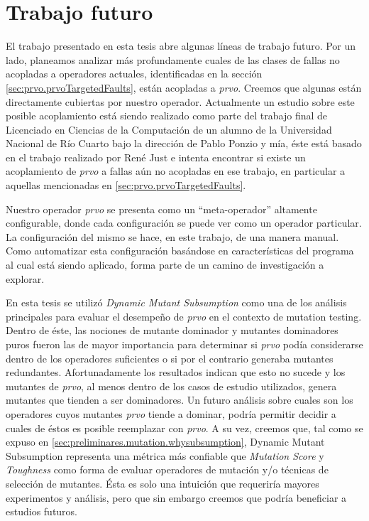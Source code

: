 \chapter[Trabajo futuro]{Trabajo futuro}
\label{cap:futurework}

El trabajo presentado en esta tesis abre algunas l\'ineas de trabajo futuro. Por un lado, planeamos analizar m\'as profundamente cuales de las clases de fallas no acopladas a operadores actuales, identificadas en la secci\'on \ref{sec:prvo.prvoTargetedFaults}, est\'an acopladas a \emph{prvo}. Creemos que algunas est\'an directamente cubiertas por nuestro operador. Actualmente un estudio sobre este posible acoplamiento est\'a siendo realizado como parte del trabajo final de Licenciado en Ciencias de la Computaci\'on de un alumno de la Universidad Nacional de R\'io Cuarto bajo la direcci\'on de Pablo Ponzio y m\'ia, \'este est\'a basado en el trabajo realizado por Ren\'e Just \cite{bibliography.mutation.evaluation.valid-substitute} e intenta encontrar si existe un acoplamiento de \emph{prvo} a fallas a\'un no acopladas en ese trabajo, en particular a aquellas mencionadas en \ref{sec:prvo.prvoTargetedFaults}.

Nuestro operador \emph{prvo} se presenta como un ``meta-operador'' altamente configurable, donde cada configuraci\'on se puede ver como un operador particular. La configuraci\'on del mismo se hace, en este trabajo, de una manera manual. Como automatizar esta configuraci\'on bas\'andose en caracter\'isticas del programa al cual est\'a siendo aplicado, forma parte de un camino de investigaci\'on a explorar.

En esta tesis se utiliz\'o \emph{Dynamic Mutant Subsumption} como una de los an\'alisis principales para evaluar el desempe\~no de \emph{prvo} en el contexto de mutation testing. Dentro de \'este, las nociones de mutante dominador y mutantes dominadores puros fueron las de mayor importancia para determinar si \emph{prvo} pod\'ia considerarse dentro de los operadores suficientes o si por el contrario generaba mutantes redundantes. Afortunadamente los resultados indican que esto no sucede y los mutantes de \emph{prvo}, al menos dentro de los casos de estudio utilizados, genera mutantes que tienden a ser dominadores. Un futuro an\'alisis sobre cuales son los operadores cuyos mutantes \emph{prvo} tiende a dominar, podr\'ia permitir decidir a cuales de \'estos es posible reemplazar con \emph{prvo}. A su vez, creemos que, tal como se expuso en \ref{sec:preliminares.mutation.whysubsumption}, Dynamic Mutant Subsumption representa una m\'etrica m\'as confiable que \emph{Mutation Score} y \emph{Toughness} como forma de evaluar operadores de mutaci\'on y/o t\'ecnicas de selecci\'on de mutantes. \'Esta es solo una intuici\'on que requerir\'ia mayores experimentos y an\'alisis, pero que sin embargo creemos que podr\'ia beneficiar a estudios futuros. 

